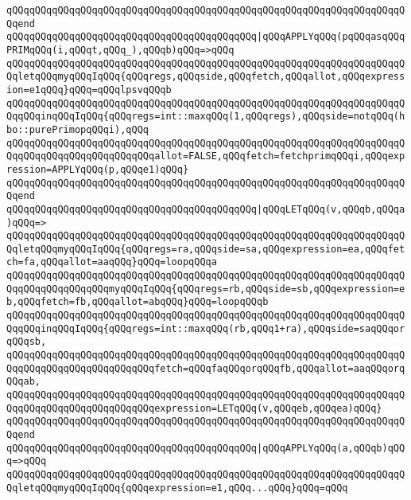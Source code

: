 \verb|qQQqqQQqqQQqqQQqqQQqqQQqqQQqqQQqqQQqqQQqqQQqqQQqqQQqqQQqqQQqqQQqqQQqqQQqend|\newline
\verb|qQQqqQQqqQQqqQQqqQQqqQQqqQQqqQQqqQQqqQQqqQQq|\verb#|qQQqAPPLYqQQq(pqQQqasqQQqPRIMqQQq(i,qQQqt,qQQq_),qQQqb)qQQq=>qQQq#\newline
\verb|qQQqqQQqqQQqqQQqqQQqqQQqqQQqqQQqqQQqqQQqqQQqqQQqqQQqqQQqqQQqqQQqqQQqqQQqletqQQqmyqQQqIqQQq{qQQqregs,qQQqside,qQQqfetch,qQQqallot,qQQqexpression=e1qQQq}qQQq=qQQqlpsvqQQqb|\newline
\verb|qQQqqQQqqQQqqQQqqQQqqQQqqQQqqQQqqQQqqQQqqQQqqQQqqQQqqQQqqQQqqQQqqQQqqQQqqQQqinqQQqIqQQq{qQQqregs=int::maxqQQq(1,qQQqregs),qQQqside=notqQQq(hbo::purePrimopqQQqi),qQQq|\newline
\verb|qQQqqQQqqQQqqQQqqQQqqQQqqQQqqQQqqQQqqQQqqQQqqQQqqQQqqQQqqQQqqQQqqQQqqQQqqQQqqQQqqQQqqQQqqQQqqQQqallot=FALSE,qQQqfetch=fetchprimqQQqi,qQQqexpression=APPLYqQQq(p,qQQqe1)qQQq}|\newline
\verb|qQQqqQQqqQQqqQQqqQQqqQQqqQQqqQQqqQQqqQQqqQQqqQQqqQQqqQQqqQQqqQQqqQQqqQQqend|\newline
\verb|qQQqqQQqqQQqqQQqqQQqqQQqqQQqqQQqqQQqqQQqqQQq|\verb#|qQQqLETqQQq(v,qQQqb,qQQqa)qQQq=>#\newline
\verb|qQQqqQQqqQQqqQQqqQQqqQQqqQQqqQQqqQQqqQQqqQQqqQQqqQQqqQQqqQQqqQQqqQQqqQQqletqQQqmyqQQqIqQQq{qQQqregs=ra,qQQqside=sa,qQQqexpression=ea,qQQqfetch=fa,qQQqallot=aaqQQq}qQQq=loopqQQqa|\newline
\verb|qQQqqQQqqQQqqQQqqQQqqQQqqQQqqQQqqQQqqQQqqQQqqQQqqQQqqQQqqQQqqQQqqQQqqQQqqQQqqQQqqQQqqQQqmyqQQqIqQQq{qQQqregs=rb,qQQqside=sb,qQQqexpression=eb,qQQqfetch=fb,qQQqallot=abqQQq}qQQq=loopqQQqb|\newline
\verb|qQQqqQQqqQQqqQQqqQQqqQQqqQQqqQQqqQQqqQQqqQQqqQQqqQQqqQQqqQQqqQQqqQQqqQQqqQQqinqQQqIqQQq{qQQqregs=int::maxqQQq(rb,qQQq1+ra),qQQqside=saqQQqorqQQqsb,|\newline
\verb|qQQqqQQqqQQqqQQqqQQqqQQqqQQqqQQqqQQqqQQqqQQqqQQqqQQqqQQqqQQqqQQqqQQqqQQqqQQqqQQqqQQqqQQqqQQqqQQqfetch=qQQqfaqQQqorqQQqfb,qQQqallot=aaqQQqorqQQqab,|\newline
\verb|qQQqqQQqqQQqqQQqqQQqqQQqqQQqqQQqqQQqqQQqqQQqqQQqqQQqqQQqqQQqqQQqqQQqqQQqqQQqqQQqqQQqqQQqqQQqqQQqexpression=LETqQQq(v,qQQqeb,qQQqea)qQQq}|\newline
\verb|qQQqqQQqqQQqqQQqqQQqqQQqqQQqqQQqqQQqqQQqqQQqqQQqqQQqqQQqqQQqqQQqqQQqqQQqend|\newline
\verb|qQQqqQQqqQQqqQQqqQQqqQQqqQQqqQQqqQQqqQQqqQQq|\verb#|qQQqAPPLYqQQq(a,qQQqb)qQQq=>qQQq#\newline
\verb|qQQqqQQqqQQqqQQqqQQqqQQqqQQqqQQqqQQqqQQqqQQqqQQqqQQqqQQqqQQqqQQqqQQqqQQqletqQQqmyqQQqIqQQq{qQQqexpression=e1,qQQq...qQQq}qQQq=qQQq|\newline
